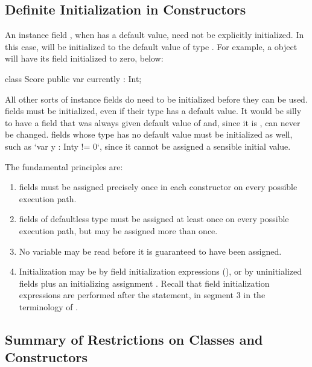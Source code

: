 \subsection{Definite Initialization in Constructors}


An instance field , when  has a default value, need not be
explicitly initialized.  In this case,  will be initialized to the
default value of type .  For example, a  object will have
its  field initialized to zero, below:
\begin{xten}
class Score {
  public var currently : Int;
}
\end{xten}
%

All other sorts of instance fields do need to be initialized before they can
be used.   fields must be initialized, even if their type has a
default value.  It would be silly to have a field  that was
always given default value of  and, since it is , can never be
changed.   fields whose type has no default value must be initialized
as well, such as \xcd`var y : Int{y != 0}`, since it cannot be assigned a
sensible initial value.

The fundamental principles are:
\begin{enumerate}
\item {} fields must be assigned precisely once in each constructor on every
possible execution path.
\item {} fields of defaultless type must be
assigned at least once on every possible execution path, but may be assigned
more than once.
\item No variable may be read before it is guaranteed to have been
assigned.
\item Initialization may be by field initialization expressions (), or by uninitialized fields  plus
an initializing assignment .  Recall that field initialization
expressions are performed after the  statement, in segment 3 in
the terminology of .
\end{enumerate}



\subsection{Summary of Restrictions on Classes and Constructors}

